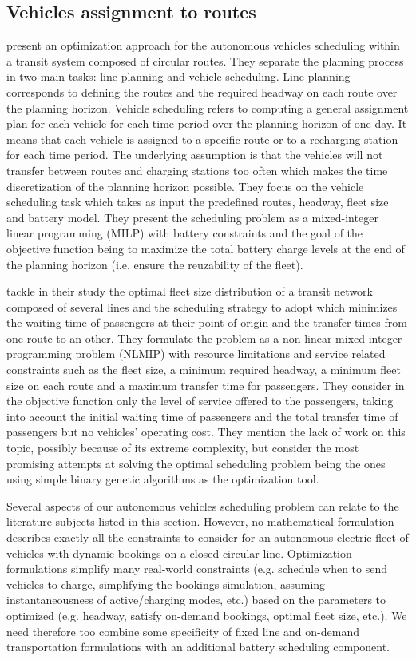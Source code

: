\documentclass[12pt,a4paper]{article}
\begin{document}
\subsection{Vehicles assignment to routes}\label{luts}
\cite{luts} present an optimization approach for the autonomous vehicles scheduling within a transit system composed of circular routes. They separate the planning process in two main tasks: line planning and vehicle scheduling. Line planning corresponds to defining the routes and the required headway on each route over the planning horizon. Vehicle scheduling refers to computing a general assignment plan for each vehicle for each time period over the planning horizon of one day. It means that each vehicle is assigned to a specific route or to a recharging station for each time period. The underlying assumption is that the vehicles will not transfer between routes and charging stations too often which makes the time discretization of the planning horizon possible. They focus on the vehicle scheduling task which takes as input the predefined routes, headway, fleet size and battery model. They present the scheduling problem as a mixed-integer linear programming (MILP) with battery constraints and the goal of the objective function being to maximize the total battery charge levels at the end of the planning horizon (i.e. ensure the reuzability of the fleet). 

\cite{ga} tackle in their study the optimal fleet size distribution of a transit network composed of several lines and the scheduling strategy to adopt which minimizes the waiting time of passengers at their point of origin and the transfer times from one route to an other. They formulate the problem as a non-linear mixed integer programming problem (NLMIP) with resource limitations and service related constraints such as the fleet size, a minimum required headway, a minimum fleet size on each route and a maximum transfer time for passengers. They consider in the objective function only the level of service offered to the passengers, taking into account the initial waiting time of passengers and the total transfer time of passengers but no vehicles' operating cost. They mention the lack of work on this topic, possibly because of its extreme complexity, but consider the most promising attempts at solving the optimal scheduling problem being the ones using simple binary genetic algorithms as the optimization tool. 

Several aspects of our autonomous vehicles scheduling problem can relate to the literature subjects listed in this section. However, no mathematical formulation describes exactly all the constraints to consider for an autonomous electric fleet of vehicles with dynamic bookings on a closed circular line. Optimization formulations simplify many real-world constraints (e.g. schedule when to send vehicles to charge, simplifying the bookings simulation, assuming instantaneousness of active/charging modes, etc.) based on the parameters to optimized (e.g. headway, satisfy on-demand bookings, optimal fleet size, etc.). We need therefore too combine some specificity of fixed line and on-demand transportation formulations with an additional battery scheduling component.  
\end{document}
